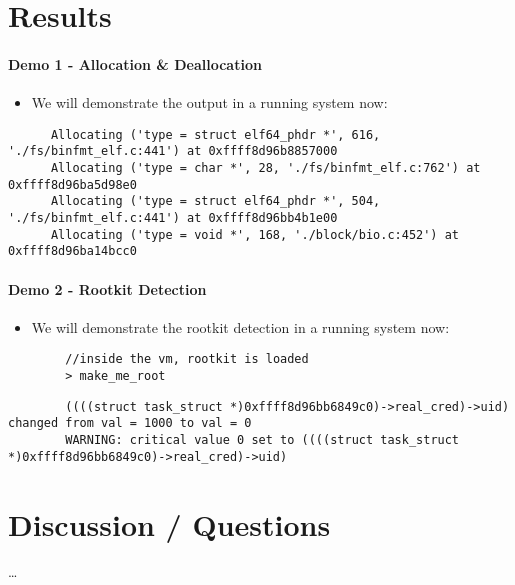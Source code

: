 \documentclass{i20lecture}
\begin{document}
\section{Results}

\begin{frame}[fragile]{\insertsection}
  \framesubtitle{Demo 1 - Allocation \& Deallocation}
    \begin{itemize}
     \item We will demonstrate the output in a running system now:
     \end{itemize}
     \begin{lstlisting}
      Allocating ('type = struct elf64_phdr *', 616, './fs/binfmt_elf.c:441') at 0xffff8d96b8857000
      Allocating ('type = char *', 28, './fs/binfmt_elf.c:762') at 0xffff8d96ba5d98e0
      Allocating ('type = struct elf64_phdr *', 504, './fs/binfmt_elf.c:441') at 0xffff8d96bb4b1e00
      Allocating ('type = void *', 168, './block/bio.c:452') at 0xffff8d96ba14bcc0

     \end{lstlisting}

\end{frame}

\begin{frame}[fragile]{\insertsection}
  \framesubtitle{Demo 2 - Rootkit Detection}
    \begin{itemize}
     \item We will demonstrate the rootkit detection in a running system now:
     \end{itemize}
     \begin{lstlisting}
        //inside the vm, rootkit is loaded
        > make_me_root
     \end{lstlisting}
     \begin{lstlisting}
        ((((struct task_struct *)0xffff8d96bb6849c0)->real_cred)->uid) changed from val = 1000 to val = 0
        WARNING: critical value 0 set to ((((struct task_struct *)0xffff8d96bb6849c0)->real_cred)->uid)

     \end{lstlisting}
     

\end{frame}

\section{Discussion / Questions}
\begin{frame}{\insertsection}
  \begin{center}
    \LARGE \dots
  \end{center}
\end{frame}
\end{document}
